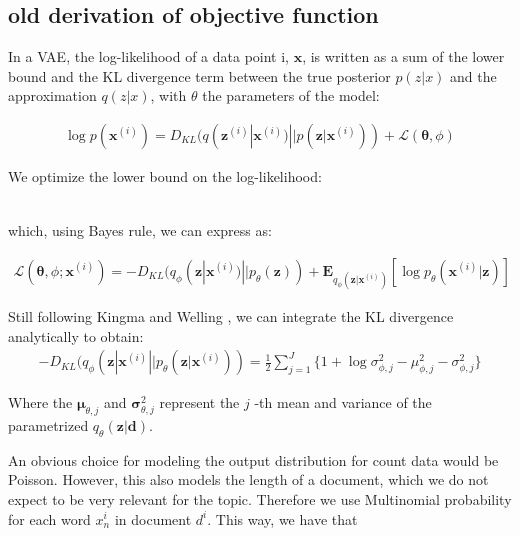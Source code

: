\documentclass{report}
\begin{document}
\subsection{old derivation of objective function}

In a VAE, the log-likelihood of a data point i, $\mathbf{x}$, is written as a sum of the lower bound and the KL divergence term between the true posterior $p(z|x)$ and the approximation $q(z|x)$, with $\theta$ the parameters of the model:

\begin{align*}
\log p(\mathbf{x}^{(i)}) = D_{KL}(q(\mathbf{z}^{(i)}|\mathbf{x}^{(i)}) || p(\mathbf{z}|\mathbf{x}^{(i)})) + \mathcal{L}(\mathbf{\theta}, \phi)
\end{align*}

We optimize the lower bound on the log-likelihood: 

\begin{align}
\end{align}

which, using Bayes rule, we can express as:

\begin{align}
\mathcal{L}(\mathbf{\theta}, \phi; \mathbf{x}^{(i)}) = -D_{KL}(q_\phi (\mathbf{z}| \mathbf{x}^{(i)})||p_\theta (\mathbf{z})) + \mathbf{E}_{q_\phi(\mathbf{z}|\mathbf{x}^{(i)})}[\log p_\theta (\mathbf{x}^{(i)}|\mathbf{z})]
\end{align}



Still following Kingma and Welling \cite{kingma2013auto}, we can integrate the KL divergence analytically to obtain: \\


\begin{align}
- D_{KL}(q_\phi (\mathbf{z}| \mathbf{x}^{(i)}||p_\theta (\mathbf{z}| \mathbf{x}^{(i)})) = \frac{1}{2}\sum\limits_{j=1}^{J}\{1+\log \sigma_{\phi ,j}^2 - \mu_{\phi,j}^2 - \sigma_{\phi ,j}^2\}
\end{align}

Where the $\mathbf{\mu}_{\theta,j}$ and $\mathbf{\sigma}_{\theta,j}^2$ represent the $j$ -th mean and variance of the parametrized $q_\theta(\mathbf{z}|\mathbf{d})$.

An obvious choice for modeling the output distribution for count data would be Poisson. However, this also models the length of a document, which we do not expect to be very relevant for the topic. Therefore we use Multinomial probability for each word $x_n^{i}$ in document $d^{i}$. This way, we have that
\end{document}
